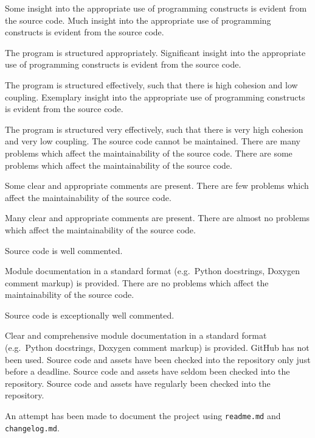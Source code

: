 \documentclass{../fal_assignment}
\begin{document}
\begin{markingrubric}
        \grade 		Some insight into the appropriate use of programming constructs is evident from the source code.
        \grade 		Much insight into the appropriate use of programming constructs is evident from the source code.
        \par 		The program is structured appropriately.
        \grade 		Significant insight into the appropriate use of programming constructs is evident from the source code.
        \par 		The program is structured effectively, such that there is high cohesion and low coupling.
        \grade 		Exemplary insight into the appropriate use of programming constructs is evident from the source code.
        \par 		The program is structured very effectively, such that there is very high cohesion and very low coupling.
%
        \grade\fail 	The source code cannot be maintained.
        \grade 		There are many problems which affect the maintainability of the source code.
        \grade 		There are some problems which affect the maintainability of the source code. 
        \par 		Some clear and appropriate comments are present.
        \grade 		There are few problems which affect the maintainability of the source code. 
        \par 		Many clear and appropriate comments are present.
        \grade 		There are almost no problems which affect the maintainability of the source code. 
        \par 		Source code is well commented.
        \par 		Module documentation in a standard format (e.g.\ Python docstrings, Doxygen comment markup) is provided.
        \grade 		There are no problems which affect the maintainability of the source code.
        \par 		Source code is exceptionally well commented.
        \par 		Clear and comprehensive module documentation in a standard format (e.g.\ Python docstrings, Doxygen comment markup) is provided. 
%
        \grade\fail 	GitHub has not been used.
        \grade 		Source code and assets have been checked into the repository only just before a deadline.
        \grade 		Source code and assets have seldom been checked into the repository.
        \grade 		Source code and assets have regularly been checked into the repository.
        \par 		An attempt has been made to document the project using \texttt{readme.md} and \texttt{changelog.md}.

\end{markingrubric}
\end{document}

